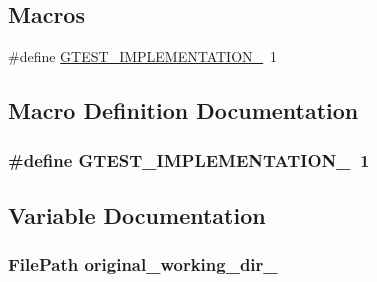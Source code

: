 \subsection*{Macros}
\begin{DoxyCompactItemize}
\item 
\#define \hyperlink{gtest-options__test_8cc_a83bd232fd1077579fada92c31bb7469f}{G\+T\+E\+S\+T\+\_\+\+I\+M\+P\+L\+E\+M\+E\+N\+T\+A\+T\+I\+O\+N\+\_\+}~1
\end{DoxyCompactItemize}


\subsection{Macro Definition Documentation}
\subsubsection[{\texorpdfstring{G\+T\+E\+S\+T\+\_\+\+I\+M\+P\+L\+E\+M\+E\+N\+T\+A\+T\+I\+O\+N\+\_\+}{GTEST_IMPLEMENTATION_}}]{\setlength{\rightskip}{0pt plus 5cm}\#define G\+T\+E\+S\+T\+\_\+\+I\+M\+P\+L\+E\+M\+E\+N\+T\+A\+T\+I\+O\+N\+\_\+~1}\hypertarget{gtest-options__test_8cc_a83bd232fd1077579fada92c31bb7469f}{}\label{gtest-options__test_8cc_a83bd232fd1077579fada92c31bb7469f}


\subsection{Variable Documentation}
\subsubsection[{\texorpdfstring{original\+\_\+working\+\_\+dir\+\_\+}{original_working_dir_}}]{\setlength{\rightskip}{0pt plus 5cm}File\+Path original\+\_\+working\+\_\+dir\+\_\+\hspace{0.3cm}{\ttfamily [protected]}}\hypertarget{gtest-options__test_8cc_aa5f13fd18a275d0a3117700f30bfb9ff}{}\label{gtest-options__test_8cc_aa5f13fd18a275d0a3117700f30bfb9ff}
